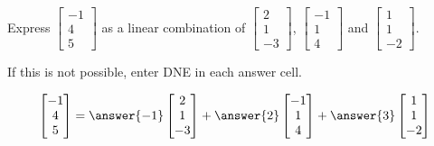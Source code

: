 \documentclass{ximera}
\author{}
\begin{document}
\begin{exercise}
Express $\begin{bmatrix}-1\\4\\5\end{bmatrix}$ as a linear combination of $\begin{bmatrix}2\\1\\-3\end{bmatrix}$, $\begin{bmatrix}-1\\1\\4\end{bmatrix}$ and $\begin{bmatrix}1\\1\\-2\end{bmatrix}$.

If this is not possible, enter DNE in each answer cell.

$$\begin{bmatrix}-1\\4\\5\end{bmatrix}=\answer{-1}\begin{bmatrix}2\\1\\-3\end{bmatrix}+\answer{2}\begin{bmatrix}-1\\1\\4\end{bmatrix}+\answer{3}\begin{bmatrix}1\\1\\-2\end{bmatrix}$$
\end{exercise}
\end{document}
